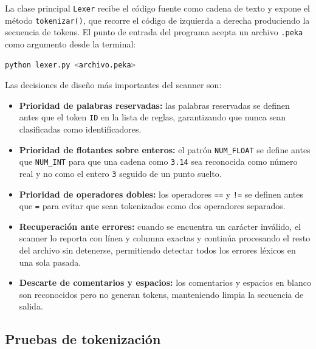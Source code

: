 \documentclass[12pt]{article}
\begin{document}
La clase principal \texttt{Lexer} recibe el código fuente como cadena de
texto y expone el método \texttt{tokenizar()}, que recorre el código de
izquierda a derecha produciendo la secuencia de tokens. El punto de entrada
del programa acepta un archivo \texttt{.peka} como argumento desde la
terminal:

\begin{lstlisting}[language=bash, caption={Uso del scanner desde terminal}]
python lexer.py <archivo.peka>
\end{lstlisting}

\noindent
Las decisiones de diseño más importantes del scanner son:

\begin{itemize}
    \item \textbf{Prioridad de palabras reservadas:} las palabras reservadas
          se definen antes que el token \texttt{ID} en la lista de reglas,
          garantizando que nunca sean clasificadas como identificadores.

    \item \textbf{Prioridad de flotantes sobre enteros:} el patrón
          \texttt{NUM\_FLOAT} se define antes que \texttt{NUM\_INT} para
          que una cadena como \texttt{3.14} sea reconocida como número
          real y no como el entero \texttt{3} seguido de un punto suelto.

    \item \textbf{Prioridad de operadores dobles:} los operadores
          \texttt{==} y \texttt{!=} se definen antes que \texttt{=} para
          evitar que sean tokenizados como dos operadores separados.

    \item \textbf{Recuperación ante errores:} cuando se encuentra un
          carácter inválido, el scanner lo reporta con línea y columna
          exactas y continúa procesando el resto del archivo sin detenerse,
          permitiendo detectar todos los errores léxicos en una sola pasada.

    \item \textbf{Descarte de comentarios y espacios:} los comentarios y
          espacios en blanco son reconocidos pero no generan tokens,
          manteniendo limpia la secuencia de salida.
\end{itemize}

\subsection{Pruebas de tokenización}
\end{document}
